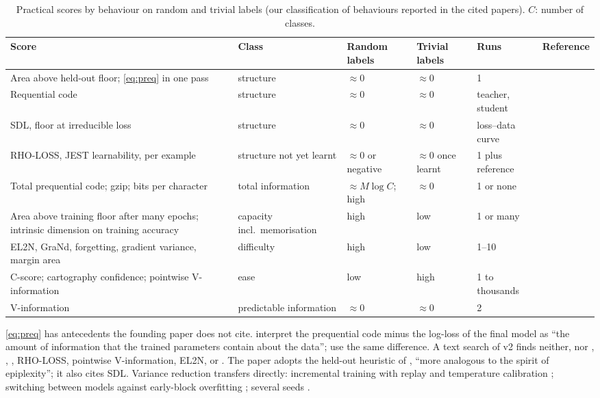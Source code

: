 \documentclass[11pt]{article}
\theoremstyle{tight}
\begin{document}
\begin{table}[!htb]
\centering\footnotesize
\caption{Practical scores by behaviour on random and trivial labels (our classification of behaviours
reported in the cited papers). $C$: number of classes.}\label{tab:practical}
\begin{tabularx}{\textwidth}{@{}P{5.2cm}P{2.5cm}P{1.6cm}P{1.5cm}P{1.6cm}L@{}}
\toprule
Score & Class & Random labels & Trivial labels & Runs & Reference \\
\midrule
Area above held-out floor; \eqref{eq:preq} in one pass & structure & $\approx0$ & $\approx0$ & 1 & \citet{zhang2020transfer} \\
Requential code & structure & $\approx0$ & $\approx0$ & teacher, student & \citet{qiu2026requential} \\
SDL, floor at irreducible loss & structure & $\approx0$ & $\approx0$ & loss--data curve & \citet{whitney2020} \\
RHO-LOSS, JEST learnability, per example & structure not yet learnt & $\approx0$ or negative & $\approx0$ once learnt & 1 plus reference & \citet{mindermann2022,evans2024} \\
Total prequential code; gzip; bits per character & total information & $\approx M\log C$; high & $\approx0$ & 1 or none & \citet{blier2018,voita2020,pandey2024,deletang2024} \\
Area above training floor after many epochs; intrinsic dimension on training accuracy & capacity incl.\ memorisation & high & low & 1 or many & \citet{zhang2020transfer,li2018intrinsic} \\
EL2N, GraNd, forgetting, gradient variance, margin area & difficulty & high & low & 1--10 & \citet{paul2021,toneva2019,agarwal2022,pleiss2020} \\
C-score; cartography confidence; pointwise V-information & ease & low & high & 1 to thousands & \citet{jiang2021cscore,swayamdipta2020,ethayarajh2022} \\
V-information & predictable information & $\approx0$ & $\approx0$ & 2 & \citet{xu2020} \\
\bottomrule
\end{tabularx}
\end{table}

\eqref{eq:preq} has antecedents the founding paper does not cite. \citet{blier2018} interpret the
prequential code minus the log-loss of the final model as ``the amount of information that the trained
parameters contain about the data''; \citet{voita2020} use the same difference. A text search of v2 finds
neither, nor \citet{bornschein2022}, \citet{perez2021}, \citet{yogatama2019}, RHO-LOSS, pointwise
V-information, EL2N, \citet{achille2021} or \citet{bialek2001}. The paper adopts the held-out heuristic
of \citet{zhang2020transfer}, ``more analogous to the spirit of epiplexity''; it also cites SDL. Variance
reduction transfers directly: incremental training with replay and temperature calibration
\citep{bornschein2022}; switching between models against early-block overfitting \citep{blier2018};
several seeds \citep{perez2021}.
\end{document}
